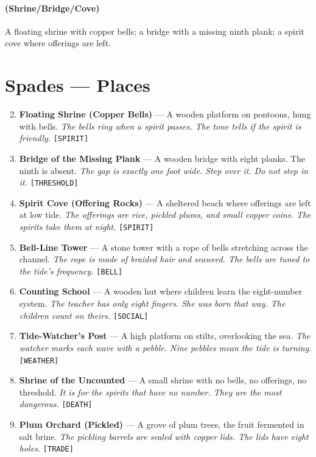 \paragraph*{(Shrine/Bridge/Cove)} A floating shrine with copper bells; a bridge with a missing ninth plank; a spirit cove where offerings are left.

\section*{Spades --- Places}
\label{sec:aelinnel-places}
\begin{enumerate}
\setcounter{enumi}{1}
\item \textbf{Floating Shrine (Copper Bells)} --- A wooden platform on pontoons, hung with bells.
  \hfill \textit{The bells ring when a spirit passes. The tone tells if the spirit is friendly.} \texttt{[SPIRIT]}
\item \textbf{Bridge of the Missing Plank} --- A wooden bridge with eight planks. The ninth is absent.
  \hfill \textit{The gap is exactly one foot wide. Step over it. Do not step in it.} \texttt{[THRESHOLD]}
\item \textbf{Spirit Cove (Offering Rocks)} --- A sheltered beach where offerings are left at low tide.
  \hfill \textit{The offerings are rice, pickled plums, and small copper coins. The spirits take them at night.} \texttt{[SPIRIT]}
\item \textbf{Bell-Line Tower} --- A stone tower with a rope of bells stretching across the channel.
  \hfill \textit{The rope is made of braided hair and seaweed. The bells are tuned to the tide's frequency.} \texttt{[BELL]}
\item \textbf{Counting School} --- A wooden hut where children learn the eight-number system.
  \hfill \textit{The teacher has only eight fingers. She was born that way. The children count on theirs.} \texttt{[SOCIAL]}
\item \textbf{Tide-Watcher's Post} --- A high platform on stilts, overlooking the sea.
  \hfill \textit{The watcher marks each wave with a pebble. Nine pebbles mean the tide is turning.} \texttt{[WEATHER]}
\item \textbf{Shrine of the Uncounted} --- A small shrine with no bells, no offerings, no threshold.
  \hfill \textit{It is for the spirits that have no number. They are the most dangerous.} \texttt{[DEATH]}
\item \textbf{Plum Orchard (Pickled)} --- A grove of plum trees, the fruit fermented in salt brine.
  \hfill \textit{The pickling barrels are sealed with copper lids. The lids have eight holes.} \texttt{[TRADE]}

\end{enumerate}
